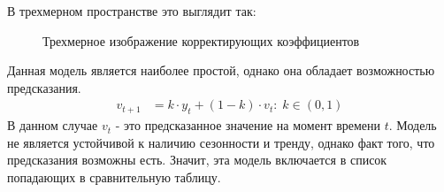 В трехмерном пространстве это выглядит так:
\begin{figure}[H]
	\centering
	\caption{Трехмерное изображение корректирующих коэффициентов}
\end{figure}
Данная модель является наиболее простой, однако она обладает возможностью предсказания.
\begin{equation}
	\begin{split}
		v_{t + 1} & = k \cdot y_t + (1 - k) \cdot v_t: \; k \in (0, 1)
	\end{split}
\end{equation}
В данном случае $v_t$ - это предсказанное значение на момент времени $t$. Модель не является устойчивой к наличию сезонности и тренду, однако факт того, что предсказания возможны есть. Значит, эта модель включается в список попадающих в сравнительную таблицу.

